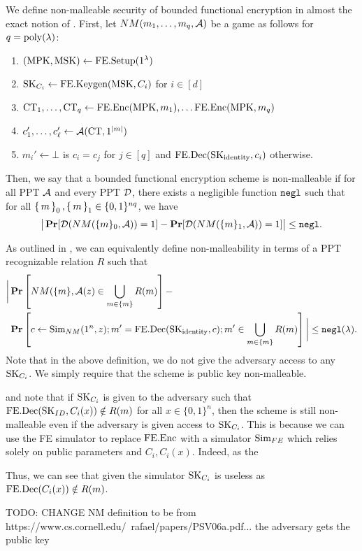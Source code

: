 We define non-malleable security of bounded functional encryption in almost the exact
notion of \cite{PassNM}. First,
let $NM(m_1, \dots, m_q, \mathcal{A})$ be a game as follows for $q = \operatorname{poly}(\lambda)$:
\begin{enumerate}
	\item $(\text{MPK}, \text{MSK}) \gets \text{FE.Setup}(1^\lambda)$
	\item $\text{SK}_{C_i} \gets \text{FE.Keygen}(\text{MSK}, C_i)$ for $i \in [d]$
	\item $\text{CT}_1, \dots, \text{CT}_q \gets \text{FE.Enc}(\text{MPK}, m_1), \dots \text{FE.Enc}(\text{MPK}, m_q)$
	\item $c_1', \dots, c_\ell' \gets \mathcal{A}(\text{CT}, 1^{|m|})$
	\item $m_i' \gets \bot$ is $c_i = c_j$ for $j \in [q]$ and $\text{FE.Dec}(\text{SK}_{\text{identity}}, c_i)$ otherwise.
\end{enumerate}
Then, we say that a bounded functional encryption scheme is non-malleable if for all PPT $\mathcal{A}$
and every PPT $\mathcal{D}$, there exists a negligible function $\texttt{negl}$ such that
for all $\set{m}_0, \set{m}_1 \in \{0, 1\}^{nq}$, we have
\begin{equation}
	\big|\operatorname*{\mathbf{Pr}}[\mathcal{D}(NM(\{m\}_0, \mathcal{A})) = 1] - \operatorname*{\mathbf{Pr}}[\mathcal{D}(NM(\{m\}_1 , \mathcal{A})) = 1] \big|\leq \texttt{negl}.
\end{equation}

As outlined in \cite{PassNM}, we can equivalently define non-malleability in terms of a PPT recognizable relation $R$
such that
\begin{align*}
	\label{eq:NMRel}
	\bigg|\operatorname*{\mathbf{Pr}}&\left[NM(\{m\} , \mathcal{A}(z) \in \bigcup_{m \in \{m\}} R(m)\right]- \\
				\operatorname*{\mathbf{Pr}}&\left[c \gets \text{Sim}_{NM}(1^n, z); m' = \text{FE.Dec}(\text{SK}_{\text{identity}}, c); m' \in \bigcup_{m \in \{m\}} R(m)\right]\bigg| \leq \texttt{negl}(\lambda).
\end{align*}
Note that in the above definition, we do not give the adversary access to any $\text{SK}_{C_i}$.
We simply require that the scheme is public key non-malleable.

and note that
if $\text{SK}_{C_i}$ is given to the adversary such that $\text{FE.Dec}(\text{SK}_{ID}, C_i(x)) \notin R(m)$ for all $x \in \{0, 1\}^n$,
then the scheme is still non-malleable even if the adversary is given access to $\text{SK}_{C_i}$.
This is because we can use the FE simulator to replace $\text{FE.Enc}$ with a simulator $\text{Sim}_{FE}$ which relies
solely on public parameters and $C_i, C_i(x)$. Indeed, as the 

Thus, we can see that given the simulator $\text{SK}_{C_i}$ is useless
as $\text{FE.Dec}(C_i(x)) \notin R(m)$.

TODO: CHANGE NM definition to be from https://www.cs.cornell.edu/~rafael/papers/PSV06a.pdf...
the adversary gets the public key



